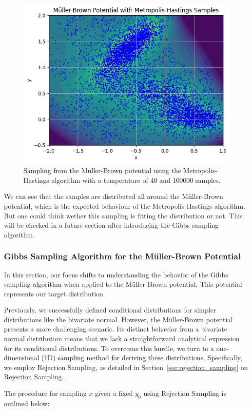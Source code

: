 \documentclass{report}
\begin{document}
\begin{figure}[H]
	\centering
	\includegraphics[width=0.5\linewidth]{./Figures/MCMC/mullerbrownmh2.png}
	\caption{Sampling from the Müller-Brown potential using the Metropolis-Hastings algorithm with a temperature of 40 and 100000 samples.}
	\label{fig:mullerbrownmh}
\end{figure}

We can see that the samples are distributed all around the Müller-Brown potential, which is the expected behaviour of the Metropolis-Hastings algorithm. But one could think wether this sampling is fitting the distribution or not. This will be checked in a future section after introducing the Gibbs sampling algorithm.


\subsubsection{Gibbs Sampling Algorithm for the Müller-Brown Potential}
\label{sec:gibbs_muller_brown}

In this section, our focus shifts to understanding the behavior of the Gibbs sampling algorithm when applied to the Müller-Brown potential. This potential represents our target distribution.

Previously, we successfully defined conditional distributions for simpler distributions like the bivariate normal. However, the Müller-Brown potential presents a more challenging scenario. Its distinct behavior from a bivariate normal distribution means that we lack a straightforward analytical expression for its conditional distributions. To overcome this hurdle, we turn to a one-dimensional (1D) sampling method for deriving these distributions. Specifically, we employ Rejection Sampling, as detailed in Section~\ref{sec:rejection_sampling} on Rejection Sampling.

The procedure for sampling \(x\) given a fixed \(y_0\) using Rejection Sampling is outlined below:
\end{document}
